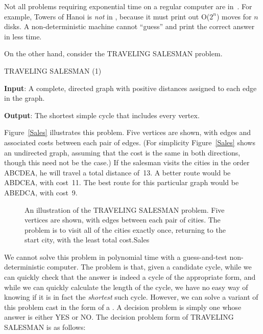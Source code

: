 Not all problems requiring exponential time on a regular
computer are in~\NP.
For example, Towers of Hanoi is \emph{not} in \NP, because it must
print out O(\(2^n\)) moves for \(n\) disks.
A non-deterministic machine cannot ``guess'' and print the correct
answer in less time.

On the other hand, consider the TRAVELING SALESMAN problem.

\begin{inbox}
\noindent TRAVELING SALESMAN (1)

{\bf Input}: A complete, directed graph  with positive
distances assigned to each edge in the graph.

{\bf Output}: The shortest simple cycle that includes every vertex.
\end{inbox}

Figure~\ref{Sales} illustrates this problem.
Five vertices are shown, with edges and associated costs between each
pair of edges.
(For simplicity Figure~\ref{Sales} shows an undirected graph,
assuming that the cost is the same in both
directions, though this need not be the case.)
If the salesman visits the cities in the order ABCDEA, he will travel
a total distance of~13.
A better route would be ABDCEA, with cost~11.
The best route for this particular graph would be ABEDCA, with cost~9.

\begin{figure}
\vspace{-\bigskipamount}

{An illustration of the TRAVELING SALESMAN problem.
Five vertices are shown, with edges between each pair of cities.
The problem is to visit all of the cities exactly once,
returning to the start city, with the least total cost.}{Sales}
\bigskip
\end{figure}

We cannot solve this problem in polynomial time with a guess-and-test
non-deterministic computer.
The problem is that, given a candidate cycle, while we can quickly
check that the answer is indeed a cycle of the appropriate form,
and while we can quickly calculate the length of the cycle,
we have no easy way of knowing if it is in fact the \emph{shortest}
such cycle.
However, we can solve a variant of this problem cast in the form
of a .
A decision problem is simply one whose answer is either YES or NO.
The decision problem form of TRAVELING SALESMAN is as follows:

